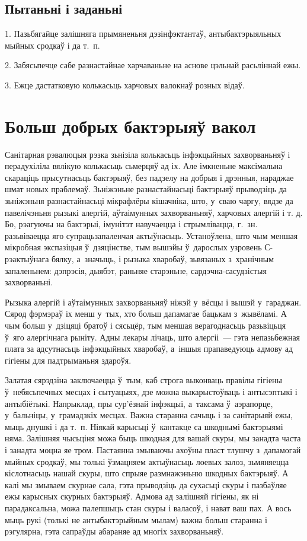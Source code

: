 \subsection*{Пытаньні і заданьні}

1. Пазьбягайце залішняга прымяненьня дэзінфэктантаў, антыбактэрыяльных мыйных сродкаў і да т.~п.

2. Забясьпечце сабе разнастайнае харчаваньне на аснове цэльнай расьліннай ежы.

3. Ежце дастатковую колькасьць харчовых валокнаў розных відаў.


\section{Больш добрых бактэрыяў вакол}

Санітарная рэвалюцыя рэзка зьнізіла колькасьць інфэкцыйных захворваньняў і перадухіліла вялікую колькасьць сьмерцяў ад іх. Але імкненьне максімальна скараціць прысутнасьць бактэрыяў, без падзелу на добрыя і дрэнныя, нараджае шмат новых праблемаў. Зьніжэньне разнастайнасьці бактэрыяў прыводзіць да зьніжэньня разнастайнасьці мікрафлёры кішачніка, што, у~сваю чаргу, вядзе да павелічэньня рызыкі алергій, аўтаімунных захворваньняў, харчовых алергій і т. д. Бо, рэагуючы на бактэрыі, імунітэт навучаецца і стрымлівацца, г.~зн. разьвіваецца яго супрацьзапаленчая актыўнасьць. Устаноўлена, што чым меншая мікробная экспазіцыя ў~дзяцінстве, тым вышэйы ў~дарослых узровень С-рэактыўнага бялку, а~значыць, і рызыка хваробаў, зьвязаных з~хранічным запаленьнем: дэпрэсія, дыябэт, раньняе старэньне, сардэчна-сасудзістыя захворваньні.

Рызыка алергій і аўтаімунных захворваньняў ніжэй у~вёсцы і вышэй у~гараджан. Сярод фэрмэраў іх менш у~тых, хто больш дапамагае бацькам з~жывёламі. А чым больш у~дзіцяці братоў і сясьцёр, тым меншая верагоднасьць разьвіцьця ў~яго алергічнага рыніту. Адны лекары лічаць, што алергіі~--- гэта непазьбежная плата за адсутнасьць інфэкцыйных хваробаў, а~іншыя прапаведуюць адмову ад гігіены для падтрыманьня здароўя.

Залатая сярэдзіна заключаецца ў~тым, каб строга выконваць правілы гігіены ў~небясьпечных месцах і сытуацыях, дзе можна выкарыстоўваць і антысэптыкі і антыбіётыкі. Напрыклад, пры сур'ёзнай інфэкцыі, а~таксама ў~аэрапорце, у~бальніцы, у~грамадзкіх месцах. Важна старанна сачыць і за санітарыяй ежы, мыць днушкі і да т.~п. Ніякай карысьці ў~кантакце са шкоднымі бактэрыямі няма. Залішняя чысьціня можа быць шкодная для вашай скуры, мы занадта часта і занадта моцна яе тром. Пастаянна змываючы ахоўны пласт тлушчу з~дапамогай мыйных сродкаў, мы толькі ўзмацняем актыўнасьць лоевых залоз, зьмяняецца кіслотнасьць нашай скуры, што спрыяе размнажэньню шкодных бактэрыяў. А калі мы змываем скурнае сала, гэта прыводзіць да сухасьці скуры і пазбаўляе ежы карысных скурных бактэрыяў. Адмова ад залішняй гігіены, як ні парадаксальна, можа палепшыць стан скуры і валасоў, і нават ваш пах. А вось мыць рукі (толькі не антыбактэрыйным мылам) важна больш старанна і рэгулярна, гэта сапраўды абараняе ад многіх захворваньняў.

